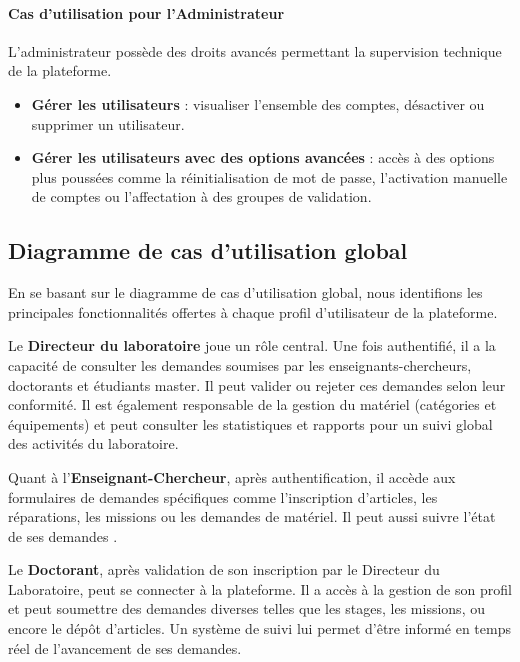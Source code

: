 \paragraph{Cas d’utilisation pour l’Administrateur}

L’administrateur possède des droits avancés permettant la supervision technique de la plateforme.

\begin{itemize}
\item \textbf{Gérer les utilisateurs} : visualiser l’ensemble des comptes, désactiver ou supprimer un utilisateur.
\item \textbf{Gérer les utilisateurs avec des options avancées} : accès à des options plus poussées comme la réinitialisation de mot de passe, l’activation manuelle de comptes ou l’affectation à des groupes de validation.
\end{itemize}

\subsection{Diagramme de cas d'utilisation global}

En se basant sur le diagramme de cas d’utilisation global, nous identifions les principales fonctionnalités offertes à chaque profil d’utilisateur de la plateforme.

Le \textbf{Directeur du laboratoire} joue un rôle central. Une fois authentifié, il a la capacité de consulter les demandes soumises par les enseignants-chercheurs, doctorants et étudiants master. Il peut valider ou rejeter ces demandes selon leur conformité. Il est également responsable de la gestion du matériel (catégories et équipements) et peut consulter les statistiques et rapports pour un suivi global des activités du laboratoire.

Quant à l'\textbf{Enseignant-Chercheur}, après authentification, il accède aux formulaires de demandes spécifiques comme l’inscription d’articles, les réparations, les missions ou les demandes de matériel. Il peut aussi suivre l'état de ses demandes .

Le \textbf{Doctorant}, après validation de son inscription par le Directeur du Laboratoire, peut se connecter à la plateforme. Il a accès à la gestion de son profil et peut soumettre des demandes diverses telles que les stages, les missions, ou encore le dépôt d’articles. Un système de suivi lui permet d’être informé en temps réel de l’avancement de ses demandes.

